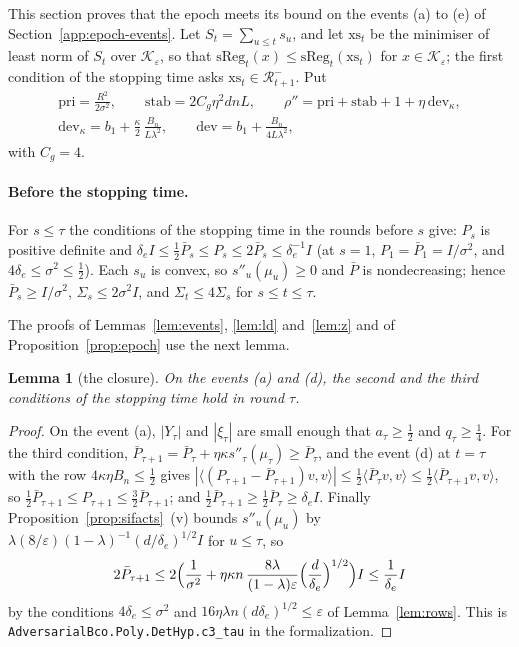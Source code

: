 \documentclass[11pt]{amsart}
\newtheorem{lemma}[theorem]{Lemma}
\theoremstyle{definition}
\numberwithin{equation}{section}
\newcommand{\cK}{\mathcal{K}}
\newcommand{\ip}[1]{\langle #1\rangle}
\begin{document}
This section proves that the epoch meets its bound on the events (a) to (e) of Section~\ref{app:epoch-events}. Let $S_t=\sum_{u\le t}s_u$, and let $\mathrm{xs}_t$ be the minimiser of least norm of $S_t$ over $\cK_\varepsilon$, so that $\mathrm{sReg}_t(x)\le\mathrm{sReg}_t(\mathrm{xs}_t)$ for $x\in\cK_\varepsilon$; the first condition of the stopping time asks $\mathrm{xs}_t\in\mathcal R^-_{t+1}$. Put
\begin{gather*}
\mathrm{pri}=\frac{R^2}{2\sigma^2},\qquad\mathrm{stab}=2C_g\eta^2dnL,\qquad\rho''=\mathrm{pri}+\mathrm{stab}+1+\eta\,\mathrm{dev}_\kappa,\\
\mathrm{dev}_\kappa=b_1+\frac\kappa2\,\frac{B_n}{L\lambda^2},\qquad\mathrm{dev}=b_1+\frac{B_n}{4L\lambda^2},
\end{gather*}
with $C_g=4$.

\paragraph{Before the stopping time.} For $s\le\tau$ the conditions of the stopping time in the rounds before $s$ give: $P_s$ is positive definite and $\delta_eI\le\frac12\bar P_s\le P_s\le2\bar P_s\le\delta_e^{-1}I$ (at $s=1$, $P_1=\bar P_1=I/\sigma^2$, and $4\delta_e\le\sigma^2\le\frac12$). Each $s_u$ is convex, so $s''_u(\mu_u)\ge0$ and $\bar P$ is nondecreasing; hence $\bar P_s\ge I/\sigma^2$, $\Sigma_s\le2\sigma^2I$, and $\Sigma_t\le4\Sigma_s$ for $s\le t\le\tau$.

The proofs of Lemmas~\ref{lem:events}, \ref{lem:ld} and~\ref{lem:z} and of Proposition~\ref{prop:epoch} use the next lemma.

\begin{lemma}[the closure]\label{lem:closure}
On the events (a) and (d), the second and the third conditions of the stopping time hold in round $\tau$.
\end{lemma}

\begin{proof}
On the event (a), $|Y_\tau|$ and $|\xi_\tau|$ are small enough that $a_\tau\ge\frac12$ and $q_\tau\ge\frac14$. For the third condition, $\bar P_{\tau+1}=\bar P_\tau+\eta\kappa s''_\tau(\mu_\tau)\ge\bar P_\tau$, and the event (d) at $t=\tau$ with the row $4\kappa\eta B_n\le\frac12$ gives $|\ip{(P_{\tau+1}-\bar P_{\tau+1})v,v}|\le\frac12\ip{\bar P_\tau v,v}\le\frac12\ip{\bar P_{\tau+1}v,v}$, so $\frac12\bar P_{\tau+1}\le P_{\tau+1}\le\frac32\bar P_{\tau+1}$; and $\frac12\bar P_{\tau+1}\ge\frac12\bar P_\tau\ge\delta_eI$. Finally Proposition~\ref{prop:sifacts}~(v) bounds $s''_u(\mu_u)$ by $\lambda(8/\varepsilon)(1-\lambda)^{-1}(d/\delta_e)^{1/2}I$ for $u\le\tau$, so
\[
2\bar P_{\tau+1}\le2\Bigl(\frac1{\sigma^2}+\eta\kappa n\,\frac{8\lambda}{(1-\lambda)\varepsilon}\Bigl(\frac d{\delta_e}\Bigr)^{1/2}\Bigr)I\le\frac1{\delta_e}I
\]
by the conditions $4\delta_e\le\sigma^2$ and $16\eta\lambda n(d\delta_e)^{1/2}\le\varepsilon$ of Lemma~\ref{lem:rows}.
This is \texttt{AdversarialBco.Poly.\allowbreak DetHyp.c3\_tau} in the formalization.
\end{proof}
\end{document}
